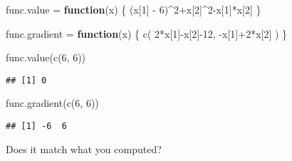\documentclass[
  a4paper,
]{article}
\newenvironment{Shaded}{\begin{snugshade}}{\end{snugshade}}
\newcommand{\ControlFlowTok}[1]{\textcolor[rgb]{0.13,0.29,0.53}{\textbf{#1}}}
\newcommand{\DecValTok}[1]{\textcolor[rgb]{0.00,0.00,0.81}{#1}}
\newcommand{\FunctionTok}[1]{\textcolor[rgb]{0.00,0.00,0.00}{#1}}
\newcommand{\NormalTok}[1]{#1}
\newcommand{\OtherTok}[1]{\textcolor[rgb]{0.56,0.35,0.01}{#1}}
\newcommand{\SpecialCharTok}[1]{\textcolor[rgb]{0.00,0.00,0.00}{#1}}
\begin{document}
\begin{Shaded}
\begin{Highlighting}[]
\NormalTok{func.value }\OtherTok{=} \ControlFlowTok{function}\NormalTok{(x) \{}
\NormalTok{  (x[}\DecValTok{1}\NormalTok{] }\SpecialCharTok{{-}} \DecValTok{6}\NormalTok{)}\SpecialCharTok{\^{}}\DecValTok{2}\SpecialCharTok{+}\NormalTok{x[}\DecValTok{2}\NormalTok{]}\SpecialCharTok{\^{}}\DecValTok{2}\SpecialCharTok{{-}}\NormalTok{x[}\DecValTok{1}\NormalTok{]}\SpecialCharTok{*}\NormalTok{x[}\DecValTok{2}\NormalTok{]}
\NormalTok{\}}

\NormalTok{func.gradient }\OtherTok{=} \ControlFlowTok{function}\NormalTok{(x) \{}
  \FunctionTok{c}\NormalTok{(}
    \DecValTok{2}\SpecialCharTok{*}\NormalTok{x[}\DecValTok{1}\NormalTok{]}\SpecialCharTok{{-}}\NormalTok{x[}\DecValTok{2}\NormalTok{]}\SpecialCharTok{{-}}\DecValTok{12}\NormalTok{,}
    \SpecialCharTok{{-}}\NormalTok{x[}\DecValTok{1}\NormalTok{]}\SpecialCharTok{+}\DecValTok{2}\SpecialCharTok{*}\NormalTok{x[}\DecValTok{2}\NormalTok{]}
\NormalTok{  )}
\NormalTok{\}}

\FunctionTok{func.value}\NormalTok{(}\FunctionTok{c}\NormalTok{(}\DecValTok{6}\NormalTok{, }\DecValTok{6}\NormalTok{))}
\end{Highlighting}
\end{Shaded}

\begin{verbatim}
## [1] 0
\end{verbatim}

\begin{Shaded}
\begin{Highlighting}[]
\FunctionTok{func.gradient}\NormalTok{(}\FunctionTok{c}\NormalTok{(}\DecValTok{6}\NormalTok{, }\DecValTok{6}\NormalTok{))}
\end{Highlighting}
\end{Shaded}

\begin{verbatim}
## [1] -6  6
\end{verbatim}

Does it match what you computed?
\end{document}
